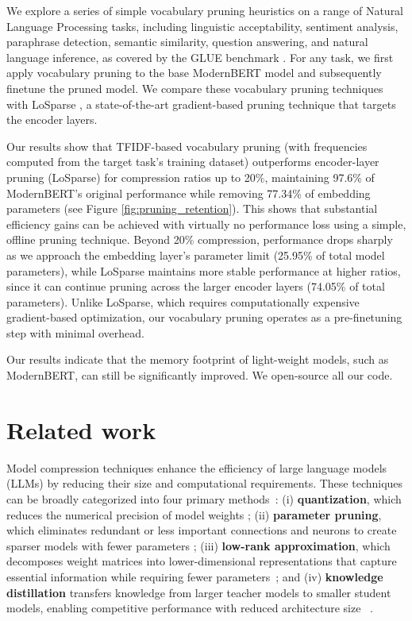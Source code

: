 \documentclass[twocolumn]{article}
\begin{document}
We explore a series of simple vocabulary pruning heuristics on a range of Natural Language Processing tasks, including linguistic acceptability, sentiment analysis, paraphrase detection, semantic similarity, question answering, and natural language inference, as covered by the GLUE benchmark \cite{wang2018glue}. For any task, we first apply vocabulary pruning to the base ModernBERT model and subsequently finetune the pruned model. We compare these vocabulary pruning techniques with LoSparse \cite{li2023losparse}, a state-of-the-art gradient-based pruning technique that targets the encoder layers.


Our results show that TFIDF-based vocabulary pruning (with frequencies computed from the target task's training dataset) outperforms encoder-layer pruning (LoSparse) for compression ratios up to 20\%, maintaining 97.6\% of ModernBERT's original performance while removing 77.34\% of embedding parameters (see Figure \ref{fig:pruning_retention}). This shows that substantial efficiency gains can be achieved with virtually no performance loss using a simple, offline pruning technique. Beyond 20\% compression, performance drops sharply as we approach the embedding layer's parameter limit (25.95\% of total model parameters), 
while LoSparse maintains more stable performance at higher ratios, since it can continue pruning across the larger encoder layers (74.05\% of total parameters). 
Unlike LoSparse, which requires computationally expensive gradient-based optimization, our vocabulary pruning operates as a pre-finetuning step with minimal overhead.


Our results indicate that the memory footprint of light-weight models, such as ModernBERT, can still be significantly improved.  We open-source all our code.

\section{Related work}
Model compression techniques enhance the efficiency of large language models (LLMs) by reducing their size and computational requirements.
% 
These techniques can be broadly categorized into four primary methods~\cite{wan2023efficient, park2024comprehensive, cheng2017survey, mishra2020survey, xailient2021compression}:
(i) \textbf{quantization}, which reduces the numerical precision of model weights \cite{gholami2021survey};
(ii) \textbf{parameter pruning}, which eliminates redundant or less important connections and neurons to create sparser models with fewer parameters \cite{cheng2023survey};
(iii) \textbf{low-rank approximation}, which decomposes weight matrices into lower-dimensional representations that capture essential information while requiring fewer parameters~\cite{Hu2021LoRA}; and
(iv) \textbf{knowledge distillation} transfers knowledge from larger teacher models to smaller student models, enabling competitive performance with reduced architecture size ~\cite{Hinton2015Distillation}.
\end{document}
